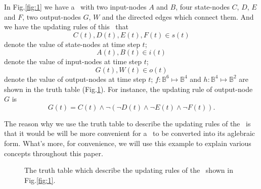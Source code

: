 \begin{example}
In Fig.\ref{fig:1} we have a \BCN\ with two input-nodes $A$ and $B$, four state-nodes $C$, $D$, $E$ and $F$, two output-nodes $G$, $W$ and the directed edges which connect them. And we have the updating rules of this \BCN\ that \[C(t), D(t), E(t), F(t)\in s(t)\] denote the value of state-nodes at time step $t$;
\[A(t), B(t)\in i(t)\] denote the value of input-nodes at time step $t$;
\[G(t), W(t)\in o(t)\] denote the value of output-nodes at time step $t$;
$f:\mathbb{B}^{6}\mapsto \mathbb{B}^4$ and $h:\mathbb{B}^4\mapsto \mathbb{B}^2$ are shown in the truth table (Fig.\ref{fig:2}).  For instance, the updating rule of output-node $G$ is 
\[G(t)=C(t)\wedge \neg(\neg{D(t)}\wedge \neg E(t)\wedge \neg F(t)).\]
	
The reason why we use the truth table to describe the updating rules of the \BCN\ is that it would be will be more convenient for a \BCN\ to be converted into its aglebraic form. What's more, for convenience, we will use this example to explain various concepts throughout this paper.
  \begin{figure}[thpb]
      \centering
      
      \caption{The truth table which describe the updating rules of the \BCN\ shown in Fig.\ref{fig:1}.}
      \label{fig:2}
   \end{figure}
   \label{exa:2}
\end{example}   


